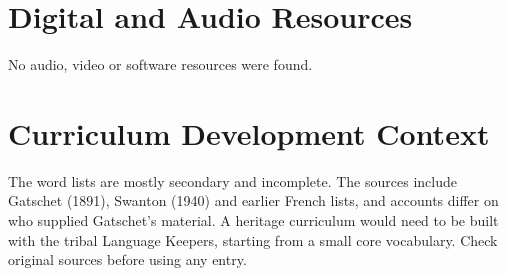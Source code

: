 \documentclass[12pt]{article}
\begin{document}
\section{Digital and Audio Resources}
No audio, video or software resources were found.

\section{Curriculum Development Context}
The word lists are mostly secondary and incomplete. The sources include Gatschet (1891), Swanton (1940) and earlier French lists, and accounts differ on who supplied Gatschet's material. A heritage curriculum would need to be built with the tribal Language Keepers, starting from a small core vocabulary. Check original sources before using any entry.
\end{document}
